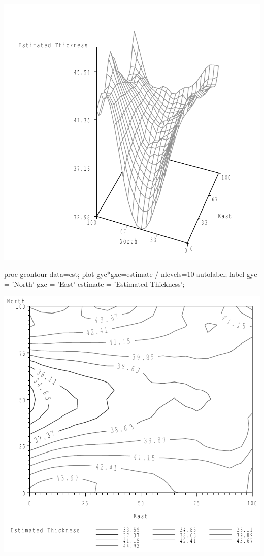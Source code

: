 \documentclass{article}
\begin{document}
\includegraphics[]{thick-3-SAS-fig.pdf}

\begin{Winput}
proc gcontour data=est;
    plot gyc*gxc=estimate / nlevels=10 autolabel;
  label gyc      = 'North' 
        gxc      = 'East' 
        estimate = 'Estimated Thickness'; 
\end{Winput}
\includegraphics[]{thick-4-SAS-fig.pdf}
\end{document}
